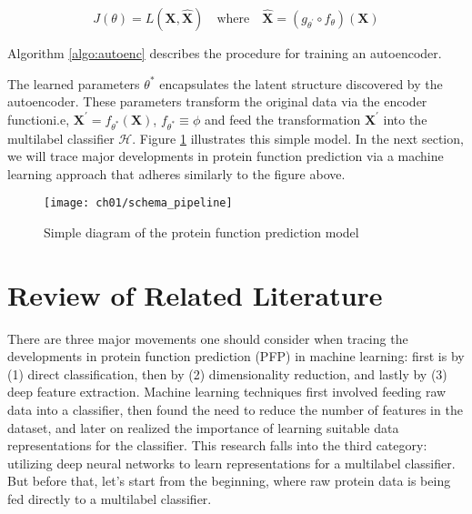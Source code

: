 \[
    J(\theta) = L(\mathbf{X}, \mathbf{\widehat{X}}) \quad \text{where} \quad
    \mathbf{\widehat{X}} = (g_{\theta^{\prime}} \circ f_{\theta}) (\mathbf{X})
\]

Algorithm \ref{algo:autoenc} describes the procedure for training an autoencoder.



The learned parameters $\theta^{\ast}$ encapsulates the latent structure
discovered by the autoencoder. These parameters transform the original data
via the encoder function\textemdash i.e, $ \mathbf{X}^{\prime} =
f_{\theta^{\ast}}(\mathbf{X})$, $f_{\theta^{\ast}} \equiv \phi$\textemdash
and feed the transformation $\mathbf{X}^{\prime}$ into the multilabel
classifier $\mathcal{H}$. Figure \ref{schema:pipeline} illustrates this
simple model. In the next section, we will trace major developments in
protein function prediction via a machine learning approach that adheres
similarly to the figure above.

\begin{figure}[!t]
  \centering
  \texttt{[image: ch01/schema\_pipeline]}
  \caption{Simple diagram of the protein function prediction model}
  \label{schema:pipeline}
\end{figure}

\section{Review of Related Literature}
\label{LiteratureReview}

\par There are three major movements one should consider when tracing the
developments in protein function prediction (PFP) in machine learning: first
is by (1) direct classification, then by (2) dimensionality reduction, and
lastly by (3) deep feature extraction. Machine learning techniques first
involved feeding raw data into a classifier, then found the need to reduce
the number of features in the dataset, and later on realized the importance
of learning suitable data representations for the classifier. This
research falls into the third category: utilizing deep neural networks to
learn representations for a multilabel classifier. But before that, let's
start from the beginning, where raw protein data is being fed directly to a
multilabel classifier.

